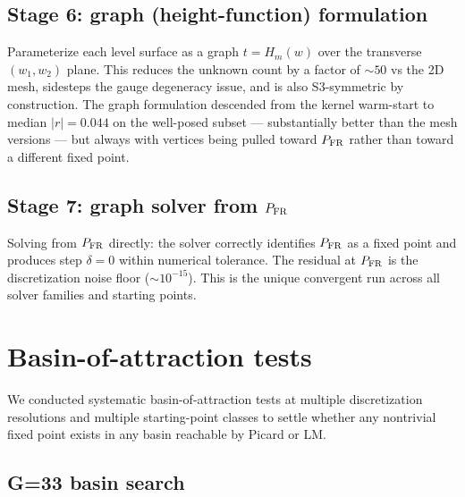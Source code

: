 \documentclass[11pt]{article}
\newcommand{\1}{\mathbf{1}}
\newcommand{\PFR}{P_{\rm FR}}
\begin{document}
\subsection{Stage 6: graph (height-function) formulation}

Parameterize each level surface as a graph $t = H_m(w)$ over the
transverse $(w_1, w_2)$ plane.  This reduces the unknown count by a
factor of $\sim 50$ vs the 2D mesh, sidesteps the gauge degeneracy
issue, and is also S3-symmetric by construction.  The graph
formulation descended from the kernel warm-start to median $|r| = 0.044$
on the well-posed subset --- substantially better than the mesh
versions --- but always with vertices being pulled toward $\PFR$ rather
than toward a different fixed point.

\subsection{Stage 7: graph solver from $\PFR$}

Solving from $\PFR$ directly: the solver correctly identifies $\PFR$ as
a fixed point and produces step $\delta = 0$ within numerical
tolerance.  The residual at $\PFR$ is the discretization noise floor
($\sim 10^{-15}$).  This is the unique convergent run across all
solver families and starting points.

\section{Basin-of-attraction tests}

We conducted systematic basin-of-attraction tests at multiple
discretization resolutions and multiple starting-point classes to
settle whether any nontrivial fixed point exists in any basin
reachable by Picard or LM.

\subsection{G=33 basin search}
\end{document}
